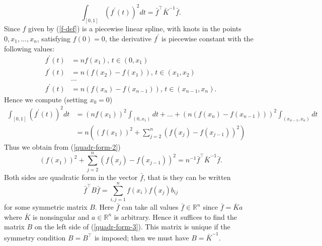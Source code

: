 \documentclass[11pt,twoside]{article}%
\theoremstyle{change}
\newenvironment{quote-env}{\begin{quote}\sffamily }{\end{quote}}
\newenvironment{mycomments-env}[1][Mycomments]{\textbf{#1.} \begin{quote-env} }{ \end{quote-env}  \ \rule{0.5em}{0.5em}}
\begin{document}
\begin{mycomments}
\begin{mycomments-env}
\begin{equation}
\int_{\left[  0,1\right]  }\left(  f^{\prime}(t)\right)  ^{2}dt=\bar{f}^{\top
}\bar{K}^{-1}\bar{f}.\label{quadr-form-2}%
\end{equation}
Since $f$ given by (\ref{f-def}) is a piecewise linear spline, with knots in
the points $0,x_{1},\ldots,x_{n}$, satisfying $f(0)=0$, the derivative
$f^{\prime}$ is piecewise constant with the following values:%
\begin{align*}
f^{\prime}(t)  & =nf(x_{1})\text{, }t\in\left(  0,x_{1}\right) \\
f^{\prime}(t)  & =n\left(  f(x_{2})-f(x_{1})\right)  \text{, }t\in\left(
x_{1},x_{2}\right) \\
& \ldots\\
f^{\prime}(t)  & =n\left(  f(x_{n})-f(x_{n-1})\right)  \text{, }t\in\left(
x_{n-1},x_{n}\right)  .
\end{align*}
Hence we compute (setting $x_{0}=0$)
\begin{align*}
\int_{\left[  0,1\right]  }\left(  f^{\prime}(t)\right)  ^{2}dt  & =\left(
nf(x_{1})\right)  ^{2}\int_{(0,x_{1})}dt+\ldots+\left(  n\left(
f(x_{n})-f(x_{n-1})\right)  \right)  ^{2}\int_{(x_{n-1},x_{n})}dt\\
& =n\left(  \left(  f(x_{1})\right)  ^{2}+\sum_{j=2}^{n}\left(  f(x_{j}%
)-f(x_{j-1})\right)  ^{2}\right)
\end{align*}
Thus we obtain from (\ref{quadr-form-2})
\begin{equation}
\left(  f(x_{1})\right)  ^{2}+\sum_{j=2}^{n}\left(  f(x_{j})-f(x_{j-1}%
)\right)  ^{2}=n^{-1}\bar{f}^{\top}\bar{K}^{-1}\bar{f}.\label{quadr-form-3}%
\end{equation}
Both sides are quadratic form in the vector $\bar{f}$, that is they can be
written
\[
\bar{f}^{\top}B\bar{f}=\sum_{i,j=1}^{n}f(x_{i})f(x_{j})b_{ij}%
\]
for some symmetric matrix $B$. Here $\bar{f}$ can take all values $\bar{f}%
\in\mathbb{R}^{n}$ since $\bar{f}=\bar{K}a$ where $\bar{K}$ is nonsingular and
$a\in\mathbb{R}^{n}$ is arbitrary. Hence it suffices to find the matrix $B$ on
the left side of (\ref{quadr-form-3}). This matrix is unique if the symmetry
condition $B=B^{\top}$ is imposed; then we must have $B=\bar{K}^{-1}$.


\end{mycomments-env}
\end{mycomments}
\end{document}
